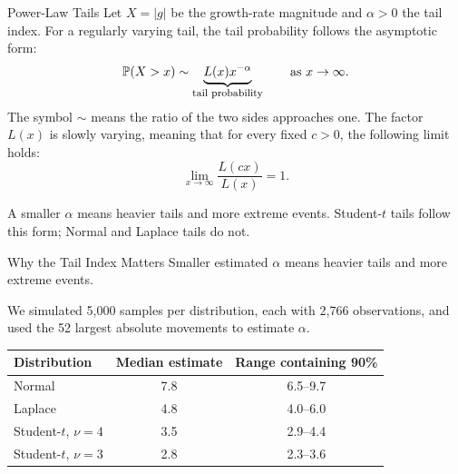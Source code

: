 \documentclass[aspectratio=169,11pt]{beamer}
\begin{document}
\begin{frame}{Power-Law Tails}
  Let $X=|g|$ be the growth-rate magnitude and $\alpha>0$ the tail index.
  For a regularly varying tail, the tail probability follows the asymptotic form:
  \[
    \mathbb P(X>x)\sim
    \underbrace{L(x)x^{-\alpha}}_{\text{\footnotesize tail probability}}
    \qquad\text{as }x\rightarrow\infty.
  \]
  The symbol $\sim$ means the ratio of the two sides approaches one.
  The factor $L(x)$ is slowly varying, meaning that for every fixed $c>0$,
  the following limit holds:
  \[
    \lim_{x\to\infty}\frac{L(cx)}{L(x)}=1.
  \]

  A smaller $\alpha$ means heavier tails and more extreme events.
  Student-$t$ tails follow this form; Normal and Laplace tails do not.
\end{frame}

\begin{frame}{Why the Tail Index Matters}
  Smaller estimated $\alpha$ means heavier tails and more extreme events.

  \vspace{0.6em}
  We simulated 5,000 samples per distribution, each with 2,766 observations,
  and used the 52 largest absolute movements to estimate $\alpha$.

  \vspace{0.6em}
  \begin{center}
    \renewcommand{\arraystretch}{1.25}
    \begin{tabular}{@{}lcc@{}}
      \toprule
      Distribution & Median estimate & Range containing 90\% \\
      \midrule
      Normal & 7.8 & 6.5--9.7 \\
      Laplace & 4.8 & 4.0--6.0 \\
      Student-$t$, $\nu=4$ & 3.5 & 2.9--4.4 \\
      Student-$t$, $\nu=3$ & 2.8 & 2.3--3.6 \\
      \bottomrule
    \end{tabular}
  \end{center}

\end{frame}
\end{document}
